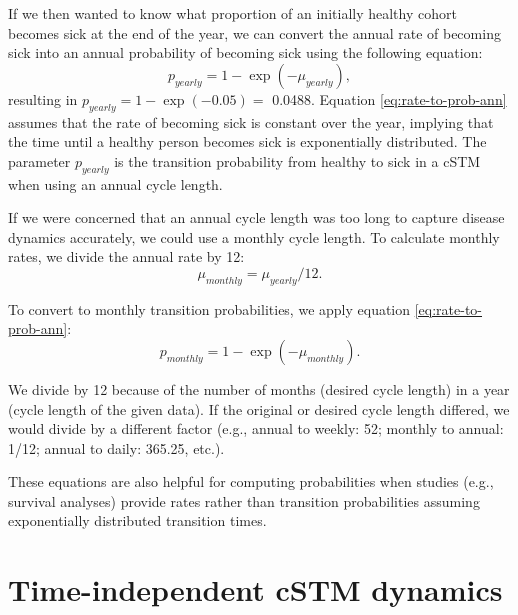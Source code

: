 \documentclass[
]{article}
\begin{document}
If we then wanted to know what proportion of an initially healthy cohort becomes sick at the end of the year, we can convert the annual rate of becoming sick into an annual probability of becoming sick using the following equation:
\begin{equation}
    p_{yearly} = 1-\exp{\left(-\mu_{yearly} \right)},
    \label{eq:rate-to-prob-ann}
\end{equation}
resulting in \(p_{yearly} = 1-\exp{(-0.05)}=\) 0.0488. Equation \eqref{eq:rate-to-prob-ann} assumes that the rate of becoming sick is constant over the year, implying that the time until a healthy person becomes sick is exponentially distributed. The parameter \(p_{yearly}\) is the transition probability from healthy to sick in a cSTM when using an annual cycle length.

If we were concerned that an annual cycle length was too long to capture disease dynamics accurately, we could use a monthly cycle length. To calculate monthly rates, we divide the annual rate by 12:
\begin{equation}
    \mu_{monthly} = \mu_{yearly} / 12.
    \label{eq:rate-ann-to-month}
\end{equation}

To convert to monthly transition probabilities, we apply equation \eqref{eq:rate-to-prob-ann}:
\begin{equation}
    p_{monthly} = 1-\exp{\left(-\mu_{monthly}\right)}.
    \label{eq:rate-to-prob-month}
\end{equation}

We divide by 12 because of the number of months (desired cycle length) in a year (cycle length of the given data). If the original or desired cycle length differed, we would divide by a different factor (e.g., annual to weekly: 52; monthly to annual: 1/12; annual to daily: 365.25, etc.).

These equations are also helpful for computing probabilities when studies (e.g., survival analyses) provide rates rather than transition probabilities assuming exponentially distributed transition times.

\hypertarget{time-independent-cstm-dynamics}{%
\section{Time-independent cSTM dynamics}\label{time-independent-cstm-dynamics}}
\end{document}
